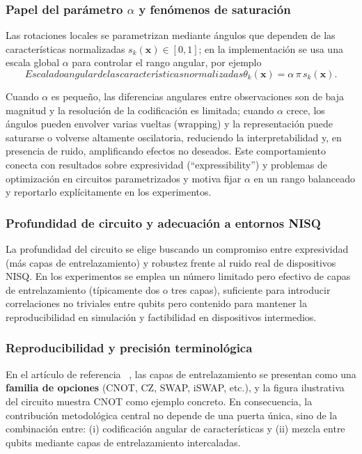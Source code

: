 \subsubsection{Papel del parámetro \texorpdfstring{$\alpha$}{alpha} y fenómenos de saturación}

Las rotaciones locales se parametrizan mediante ángulos que dependen de las características normalizadas $s_k(\mathbf{x})\in[0,1]$; en la implementación se usa una escala global $\alpha$ para controlar el rango angular, por ejemplo
\begin{equation}[eq:escala_angular_alpha]{Escalado angular de las características normalizadas}
\theta_k(\mathbf{x}) = \alpha\,\pi\, s_k(\mathbf{x}).
\end{equation}

Cuando $\alpha$ es pequeño, las diferencias angulares entre observaciones son de baja magnitud y la resolución de la codificación es limitada; cuando $\alpha$ crece, los ángulos pueden envolver varias vueltas (wrapping) y la representación puede saturarse o volverse altamente oscilatoria, reduciendo la interpretabilidad y, en presencia de ruido, amplificando efectos no deseados. Este comportamiento conecta con resultados sobre expresividad (``expressibility'') y problemas de optimización en circuitos parametrizados y motiva fijar $\alpha$ en un rango balanceado y reportarlo explícitamente en los experimentos.

\subsubsection{Profundidad de circuito y adecuación a entornos NISQ}

La profundidad del circuito se elige buscando un compromiso entre expresividad (más capas de entrelazamiento) y robustez frente al ruido real de dispositivos \gls{NISQ}. En los experimentos se emplea un número limitado pero efectivo de capas de entrelazamiento (típicamente dos o tres capas), suficiente para introducir correlaciones no triviales entre qubits pero contenido para mantener la reproducibilidad en simulación y factibilidad en dispositivos intermedios.

\subsubsection{Reproducibilidad y precisión terminológica}

En el artículo de referencia ~\cite{arian2025qhrp}, las capas de entrelazamiento se presentan como una \textbf{familia de opciones} (CNOT, CZ, SWAP, iSWAP, etc.), y la figura ilustrativa del circuito muestra CNOT como ejemplo concreto. En consecuencia, la contribución metodológica central no depende de una puerta única, sino de la combinación entre: (i) codificación angular de características y (ii) mezcla entre qubits mediante capas de entrelazamiento intercaladas.

